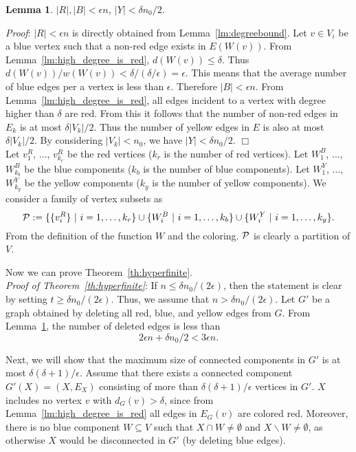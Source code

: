 \documentclass[11pt]{article}
\newtheorem{lm}[thm]{Lemma}
\newcommand{\qed}{\hspace*{\fill} $\Box$}
\begin{document}
\begin{lm}\label{lm:number_of_colored_edges}
$|R|, |B| < \epsilon n$, $|Y| < \delta n_0/2$.
\end{lm}




\noindent
{\em Proof}: 
$|R| < \epsilon n$ 
is directly obtained from 
Lemma~\ref{lm:degreebound}. 
Let $v \in V_i$ be a blue vertex 
such that a non-red edge exists in $E(W(v))$. 
From Lemma~\ref{lm:high_degree_is_red}, 
$d(W(v)) \leq \delta$. 
Thus $d(W(v))/w(W(v)) < \delta/(\delta/ \epsilon) = \epsilon$. 
This means that the average number of blue edges per a vertex is 
less than  $\epsilon$. 
Therefore $|B| <  \epsilon n$. 
From Lemma~\ref{lm:high_degree_is_red}, 
all edges incident to a vertex with degree higher than $\delta$ 
are red. 
From this it follows that  
the number of non-red edges in $E_k$ is at most  
$\delta |V_k|/2$. 
Thus the number of yellow edges in $E$ is also at most  $\delta |V_k|/2$. 
By considering $|V_k| < n_0$, 
we have 
$|Y| < \delta n_0/2$. \qed\\


Let $v^R_1$, $\ldots$, $v^R_{k_r}$ be the red vertices 
($k_r$ is the number of red vertices).
Let $W^B_1$, $\ldots$, $W^B_{k_b}$ be the blue components 
($k_b$ is the number of blue components). 
Let $W^Y_1$, $\ldots$, $W^Y_{k_y}$ be the yellow components 
($k_y$ is the number of yellow components). 
We consider a family of vertex subsets as 
$$
{\cal P} := \{ \{ v^R_i \} ~|~ i = 1, \ldots, k_r \} 
\cup \{ W^B_i ~|~ i = 1, \ldots, k_b \} 
\cup \{ W^Y_i ~|~ i = 1, \ldots, k_y \}. 
$$
From the definition of the function $W$ and the coloring. 
${\cal P}$ is clearly a partition of $V$. 




Now we can prove Theorem~\ref{th:hyperfinite}. \\



\noindent
{\em Proof of Theorem~\ref{th:hyperfinite}}: 
If $n \leq \delta n_0/ (2 \epsilon)$, 
then the statement is clear by setting 
$t \geq \delta n_0/ (2 \epsilon)$. 
Thus, we assume that 
$n > \delta n_0/ (2 \epsilon)$. 
Let $G'$ be a graph obtained by deleting all red, blue, and yellow edges from $G$. 
From Lemma~\ref{lm:number_of_colored_edges}, 
the number of deleted edges is less than 
\begin{equation}
2 \epsilon n + \delta n_0/2 < 3 \epsilon n.
\end{equation}

Next, we will show that 
the maximum size of connected components in $G'$ is at most 
$\delta (\delta+1) /\epsilon$. 
Assume that there exists a connected component $G'(X) = (X, E_X)$  
consisting of more than $\delta (\delta+1) /\epsilon$ vertices in $G'$. 
$X$ includes no vertex $v$ with $d_G(v) > \delta$, since  
from 
Lemma~\ref{lm:high_degree_is_red} 
all edges in $E_G(v)$ are colored red. 
Moreover, there is no blue component $W \subseteq V$ such that 
$X \cap W \neq \emptyset$ and $X \backslash W \neq \emptyset$, 
as otherwise $X$ would be disconnected in $G'$ (by deleting blue edges). 
\end{document}
